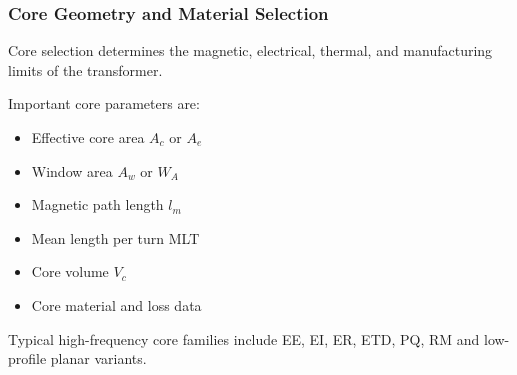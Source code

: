 \begin{frame}
    \frametitle{Core Geometry and Material Selection}
            Core selection determines the magnetic, electrical, thermal, and manufacturing limits of the transformer.

            \vspace{0.15cm}

            Important core parameters are:
            \begin{itemize}
                \item Effective core area $A_c$ or $A_e$
                \item Window area $A_w$ or $W_A$
                \item Magnetic path length $l_m$
                \item Mean length per turn MLT
                \item Core volume $V_c$
                \item Core material and loss data
            \end{itemize}
            Typical high-frequency core families include EE, EI, ER, ETD, PQ, RM and low-profile planar variants.
\end{frame}


